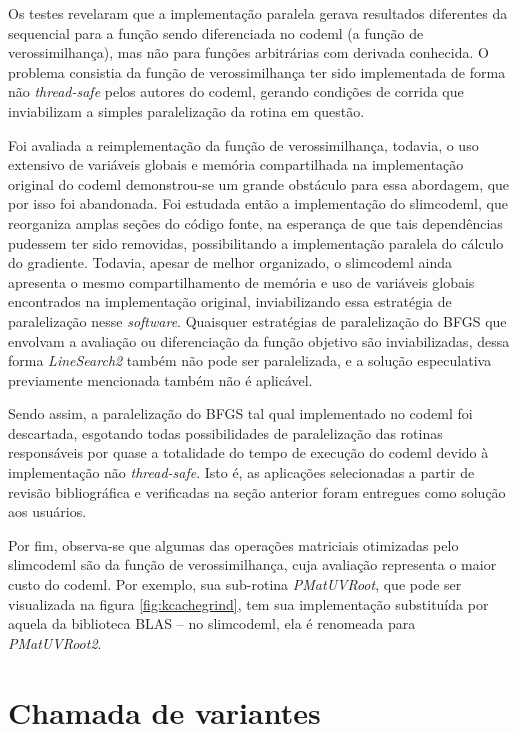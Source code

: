 \documentclass[cic,tc]{iiufrgs}
\begin{document}
Os testes revelaram que a implementação paralela gerava resultados diferentes
da sequencial para a função sendo diferenciada no codeml (a função de
verossimilhança), mas não para funções arbitrárias com derivada conhecida. O
problema consistia da função de verossimilhança ter sido implementada de forma
não \textit{thread-safe} pelos autores do codeml, gerando condições de corrida
que inviabilizam a simples paralelização da rotina em questão.

Foi avaliada a reimplementação da função de verossimilhança, todavia, o
uso extensivo de variáveis globais e memória compartilhada na implementação
original do codeml demonstrou-se um grande obstáculo para essa abordagem, que
por isso foi abandonada. Foi estudada então a implementação do slimcodeml, que
reorganiza amplas seções do código fonte, na esperança de que tais
dependências pudessem ter sido removidas, possibilitando a implementação
paralela do cálculo do gradiente. Todavia, apesar de melhor organizado, o
slimcodeml ainda apresenta o mesmo compartilhamento de memória e uso de
variáveis globais encontrados na implementação original, inviabilizando essa
estratégia de paralelização nesse \textit{software}. Quaisquer estratégias de
paralelização do BFGS que envolvam a avaliação ou diferenciação da função
objetivo são inviabilizadas, dessa forma \textit{LineSearch2} também não pode
ser paralelizada, e a solução especulativa previamente mencionada também não é
aplicável.

Sendo assim, a paralelização do BFGS tal qual implementado no codeml foi
descartada, esgotando todas possibilidades de paralelização das rotinas
responsáveis por quase a totalidade do tempo de execução do codeml devido à
implementação não \textit{thread-safe}. Isto é, as aplicações selecionadas a
partir de revisão bibliográfica e verificadas na seção anterior foram
entregues como solução aos usuários.

Por fim, observa-se que algumas das operações matriciais otimizadas pelo
slimcodeml são da função de verossimilhança, cuja avaliação representa o maior
custo do codeml. Por exemplo, sua sub-rotina \textit{PMatUVRoot}, que pode ser
visualizada na figura \ref{fig:kcachegrind}, tem sua implementação substituída
por aquela da biblioteca BLAS -- no slimcodeml, ela é renomeada para
\textit{PMatUVRoot2}.

\section{Chamada de variantes}
\label{sec:SAMtools}
\end{document}
